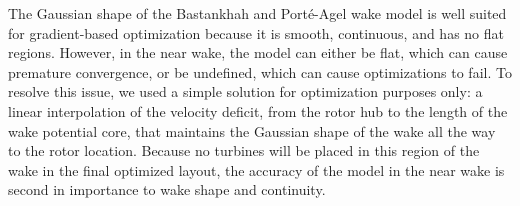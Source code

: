 \documentclass[a4paper]{jpconf}
\begin{document}
%
%

The Gaussian shape of the Bastankhah and Port\'e-Agel wake model is well suited for gradient-based optimization because it is smooth, continuous, and has no flat regions. However, in the near wake, the model can either be flat, which can cause premature convergence, or be undefined, which can cause optimizations to fail. To resolve this issue, we used a simple solution for optimization purposes only: a linear interpolation of the velocity deficit, from the rotor hub to the length of the wake potential core, that maintains the Gaussian shape of the wake all the way to the rotor location. Because no turbines will be placed in this region of the wake in the final optimized layout, the accuracy of the model in the near wake is second in importance to wake shape and continuity. 
\end{document}
